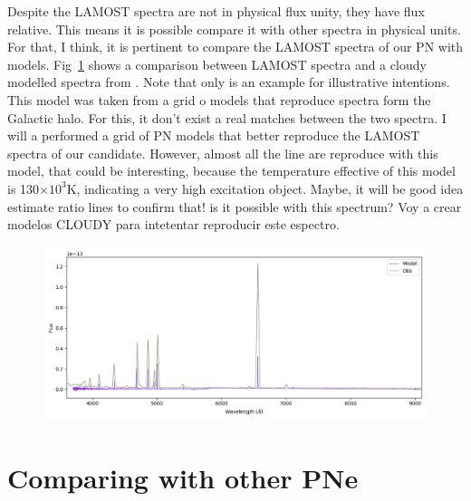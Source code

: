 \documentclass[twocolumn]{article}
\begin{document}
Despite the LAMOST spectra are not in physical flux unity, they have flux relative. This means it
is possible compare it with other spectra in physical units. For that, I think, it is pertinent to
compare the LAMOST spectra of our PN with models. Fig~\ref{fig:spectra-obs-model} shows a comparison between LAMOST spectra and a {\sc cloudy} modelled spectra from \citet{Gutierrez-Soto:2020}. Note that only is an example for illustrative intentions. This model was taken from a grid o models that reproduce spectra form the Galactic halo. For this, it don't exist a real matches between the two spectra. I will a performed a grid of PN models that better reproduce the LAMOST spectra of our candidate. However, almost all the line are reproduce with this model, that could be interesting, because the temperature effective of this model is 130$\times10^3$K, indicating a very high excitation object. Maybe, it will be good idea estimate ratio lines to confirm that! is it possible with this spectrum?
{\cs Voy a crear modelos CLOUDY para intetentar reproducir este espectro.}

\begin{figure}
\centering
  \includegraphics[width=0.89\linewidth]{../Spectra-lamostdr7/DdDm1_L4_T130_output_SED-E02-comparing-spectra}
  \caption{} 
  \label{fig:spectra-obs-model}
\end{figure}

\section{Comparing with other PNe}
\label{sec:comp}
\end{document}
